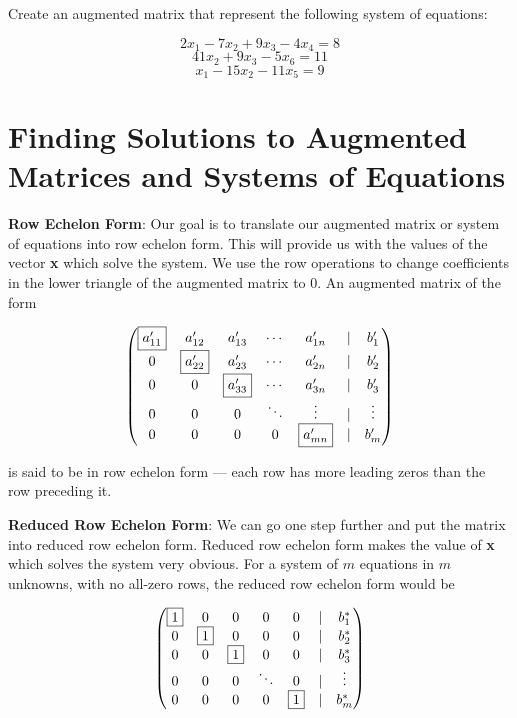 \documentclass[]{book}
\theoremstyle{definition}
\theoremstyle{definition}
\theoremstyle{definition}
\theoremstyle{remark}
\let\BeginKnitrBlock\begin \let\EndKnitrBlock\end
\begin{document}
\BeginKnitrBlock{exercise}[Augmented Matrix]
\protect\hypertarget{exr:augmatrix}{}{\label{exr:augmatrix} {} }

Create an augmented matrix that represent the following system of equations:

\[2x_1 -7x_2 + 9x_3 -4x_4 = 8\]
\[41x_2 + 9x_3 -5x_6 = 11\]
\[x_1 -15x_2 -11x_5 = 9\]
\EndKnitrBlock{exercise}

\hypertarget{finding-solutions-to-augmented-matrices-and-systems-of-equations}{%
\section{Finding Solutions to Augmented Matrices and Systems of Equations}\label{finding-solutions-to-augmented-matrices-and-systems-of-equations}}

\textbf{Row Echelon Form}: Our goal is to translate our augmented matrix or system of equations into row echelon form. This will provide us with the values of the vector \textbf{x} which solve the system. We use the row operations to change coefficients in the lower triangle of the augmented matrix to 0. An augmented matrix of the form

\[\begin{pmatrix}
            \fbox{$a'_{11}$}& a'_{12} & a'_{13}& \cdots & a'_{1n} & | & b'_1\\
            0 & \fbox{$a'_{22}$} & a'_{23}& \cdots & a'_{2n} & | & b'_2\\
            0 & 0 & \fbox{$a'_{33}$}& \cdots & a'_{3n} & | & b'_3\\
            0 & 0 &0 & \ddots & \vdots  & | & \vdots \\
            0 & 0 &0 &0 & \fbox{$a'_{mn}$} & | & b'_m
            \end{pmatrix}\]

is said to be in row echelon form --- each row has more leading zeros than the row preceding it.

\textbf{Reduced Row Echelon Form}: We can go one step further and put the matrix into reduced row echelon form. Reduced row echelon form makes the value of \textbf{x} which solves the system very obvious. For a system of \(m\) equations in \(m\) unknowns, with no all-zero rows, the reduced row echelon form would be

\[\begin{pmatrix}
            \fbox{$1$}  &  0 &   0 &    0  &   0 & | & b^*_1\\
            0  &  \fbox{$1$} &   0 &    0  &   0 & | & b^*_2\\
            0  &  0 &   \fbox{$1$} &    0  &   0 & | & b^*_3\\
            0  &  0 &   0 &\ddots &   0 & | &\vdots\\
            0  &  0 &   0 &    0  &   \fbox{$1$} & | & b^*_m
            \end{pmatrix}\]
\end{document}
